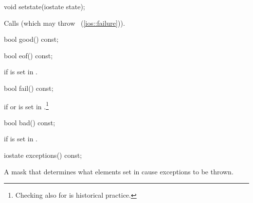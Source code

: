 %
\begin{itemdecl}
void setstate(iostate state);
\end{itemdecl}

\begin{itemdescr}
\pnum
\effects
Calls
(which may throw
~(\ref{ios::failure})).
\end{itemdescr}

%
\begin{itemdecl}
bool good() const;
\end{itemdecl}

\begin{itemdescr}
\pnum
\returns
{}
\end{itemdescr}

%
\begin{itemdecl}
bool eof() const;
\end{itemdecl}

\begin{itemdescr}
\pnum
\returns
{}
if
is set in
.
\end{itemdescr}

%
\begin{itemdecl}
bool fail() const;
\end{itemdecl}

\begin{itemdescr}
\pnum
\returns
{}
if
or
is set in
.\footnote{Checking
also for
is historical practice.}
\end{itemdescr}

%
\begin{itemdecl}
bool bad() const;
\end{itemdecl}

\begin{itemdescr}
\pnum
\returns
{}
if
is set in
.
\end{itemdescr}

%
\begin{itemdecl}
iostate exceptions() const;
\end{itemdecl}

\begin{itemdescr}
\pnum
\returns
A mask that determines what elements set in
cause exceptions to be thrown.
\end{itemdescr}

